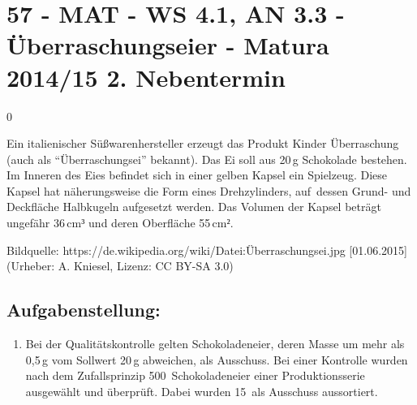 \section{57 - MAT - WS 4.1, AN 3.3 - Überraschungseier - Matura 2014/15 2. Nebentermin}

\begin{langesbeispiel} \item[0] %
	
Ein italienischer Süßwarenhersteller erzeugt das Produkt Kinder Überraschung (auch als "`Überraschungsei"' bekannt). Das Ei soll aus 20\,g Schokolade bestehen. Im Inneren des Eies befindet sich in einer gelben Kapsel ein Spielzeug. Diese Kapsel hat näherungsweise die Form eines Drehzylinders, auf dessen Grund- und Deckfläche Halbkugeln aufgesetzt werden. Das Volumen der Kapsel beträgt ungefähr 36\,cm$³$ und deren Oberfläche 55\,cm$²$.

\begin{center}
\end{center}
\begin{scriptsize}\begin{singlespace}Bildquelle: https://de.wikipedia.org/wiki/Datei:Überraschungsei.jpg [01.06.2015] (Urheber: A. Kniesel, Lizenz: CC BY-SA 3.0)\end{singlespace}\end{scriptsize}

\subsection{Aufgabenstellung:}
\begin{enumerate}
	\item Bei der Qualitätskontrolle gelten Schokoladeneier, deren Masse um mehr als 0,5\,g vom Sollwert 20\,g abweichen, als Ausschuss. Bei einer Kontrolle wurden nach dem Zufallsprinzip 500 Schokoladeneier einer Produktionsserie ausgewählt und überprüft. Dabei wurden 15 als Ausschuss aussortiert.\leer
	

\end{enumerate}
\end{langesbeispiel}
